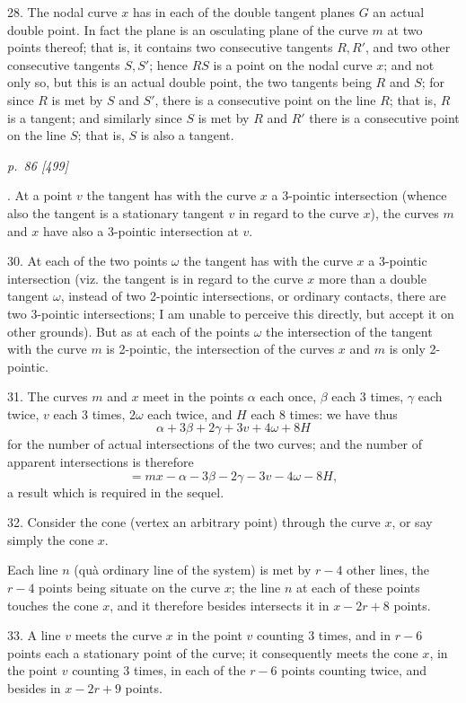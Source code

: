 \documentclass[11pt,a4paper]{article}
\newcommand{\pagemarker}[2]{\clearpage\noindent\textit{p.~#1 [#2]}\par\medskip}
\begin{document}
28. The nodal curve \(x\) has in each of the double tangent planes \(G\) an actual
double point. In fact the plane is an osculating plane of the curve \(m\) at two points
thereof; that is, it contains two consecutive tangents \(R,R'\), and two other consecutive
tangents \(S,S'\); hence \(RS\) is a point on the nodal curve \(x\); and not only so,
but this is an actual double point, the two tangents being \(R\) and \(S\); for since
\(R\) is met by \(S\) and \(S'\), there is a consecutive point on the line \(R\); that is,
\(R\) is a tangent; and similarly since \(S\) is met by \(R\) and \(R'\) there is a
consecutive point on the line \(S\); that is, \(S\) is also a tangent.

\pagemarker{86}{499}
29. At a point \(v\) the tangent has with the curve \(x\) a 3-pointic intersection
(whence also the tangent is a stationary tangent \(v\) in regard to the curve \(x\)),
the curves \(m\) and \(x\) have also a 3-pointic intersection at \(v\).

30. At each of the two points \(\omega\) the tangent has with the curve \(x\) a 3-pointic
intersection (viz. the tangent is in regard to the curve \(x\) more than a double
tangent \(\omega\), instead of two 2-pointic intersections, or ordinary contacts, there
are two 3-pointic intersections; I am unable to perceive this directly, but accept it
on other grounds). But as at each of the points \(\omega\) the intersection of the
tangent with the curve \(m\) is 2-pointic, the intersection of the curves \(x\) and
\(m\) is only 2-pointic.

31. The curves \(m\) and \(x\) meet in the points \(\alpha\) each once, \(\beta\) each 3
times, \(\gamma\) each twice, \(v\) each 3 times, \(2\omega\) each twice, and \(H\) each
8 times: we have thus
\[
  \alpha+3\beta+2\gamma+3v+4\omega+8H
\]
for the number of actual intersections of the two curves; and the number of apparent
intersections is therefore
\[
  =mx-\alpha-3\beta-2\gamma-3v-4\omega-8H,
\]
a result which is required in the sequel.

32. Consider the cone (vertex an arbitrary point) through the curve \(x\), or say
simply the cone \(x\).

Each line \(n\) (qu\`a ordinary line of the system) is met by \(r-4\) other lines, the
\(r-4\) points being situate on the curve \(x\); the line \(n\) at each of these points
touches the cone \(x\), and it therefore besides intersects it in \(x-2r+8\) points.

33. A line \(v\) meets the curve \(x\) in the point \(v\) counting 3 times, and in
\(r-6\) points each a stationary point of the curve; it consequently meets the cone
\(x\), in the point \(v\) counting 3 times, in each of the \(r-6\) points counting twice,
and besides in \(x-2r+9\) points.
\end{document}
